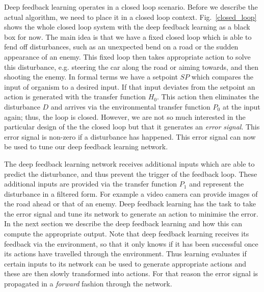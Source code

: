 \documentclass{llncs}
\begin{document}
Deep feedback learning operates in a closed loop scenario. Before we
describe the actual algorithm, we need to place it in a closed loop
context. Fig.~\ref{closed_loop} shows the whole closed loop system
with the deep feedback learning as a black box for now. The main idea
is that we have a fixed closed loop which is able to fend off
disturbances, such as an unexpected bend on a road or the sudden
appearance of an enemy. This fixed loop then takes appropriate action
to solve this disturbance, e.g. steering the car along the road or
aiming towards, and then shooting the enemy. In formal terms we have a
setpoint $SP$ which compares the input of organism to a desired
input. If that input deviates from the setpoint an action is generated
with the transfer function $H_0$. This action then eliminates the
disturbance $D$ and arrives via the environmental transfer function
$P_0$ at the input again; thus, the loop is closed. However, we are
not so much interested in the particular design of the the closed loop
but that it generates an \textsl{error signal}. This error signal is
non-zero if a disturbance has happened. This error signal can now be
used to tune our deep feedback learning network.

The deep feedback learning network receives additional inputs which are able
to predict the disturbance, and thus prevent the trigger of the feedback
loop. These additional inputs are provided via the transfer function $P_1$
and represent the disturbance in a filtered form. For example a video camera
can provide images of the road ahead or that of an enemy. Deep feedback
learning has the task to take the error signal and tune its network
to generate an action to minimise the error. In the next section
we describe the deep feedback learning and how this can
compute the appropriate output. Note that deep feedback learning receives
its feedback via the environment, so that it only knows if it has been
successful once its actions have travelled through the environment. Thus learning
evaluates if certain inputs to its network can be used to generate
appropriate actions and these are then slowly transformed into actions.
For that reason the error signal is propagated in a \textsl{forward} fashion
through the network.
\end{document}
